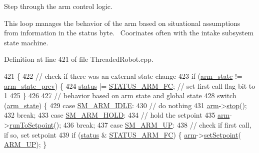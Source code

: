 Step through the arm control logic. 

This loop manages the behavior of the arm based on situational assumptions from information in the status byte.~\newline
 Coorinates often with the intake subsystem state machine. 

Definition at line 421 of file Threaded\+Robot.\+cpp.


\begin{DoxyCode}
421                                       \{
422     \textcolor{comment}{// check if there was an external state change}
423     \textcolor{keywordflow}{if} (\hyperlink{class_threaded_robot_a19026abe96d44213f7e8b3983be2d968}{arm\_state} != \hyperlink{class_threaded_robot_a77a621d5f607ff296ceac51c831a3258}{arm\_state\_prev}) \{
424         \hyperlink{class_threaded_robot_a10f3a9d1b27ca8e7a1ada75323c75879}{status} |= \hyperlink{_threaded_robot_8hpp_af64a9cac77953e37e9facd5f39a41ea6}{STATUS\_ARM\_FC}; \textcolor{comment}{// set first call flag bit to 1}
425     \}
426 
427     \textcolor{comment}{// behavior based on arm state and global state}
428     \textcolor{keywordflow}{switch} (\hyperlink{class_threaded_robot_a19026abe96d44213f7e8b3983be2d968}{arm\_state}) \{
429         \textcolor{keywordflow}{case} \hyperlink{_threaded_robot_8hpp_a96fec3d4c162b9ffe5c1c5847c58f1d9}{SM\_ARM\_IDLE}:
430             \textcolor{comment}{// do nothing}
431             \hyperlink{class_threaded_robot_afc4445eed32ecc9c375e17ccf4f37241}{arm}->\hyperlink{class_arm_a4a2070a27aecb7129cb89f4c9231278a}{stop}();
432             \textcolor{keywordflow}{break};
433         \textcolor{keywordflow}{case} \hyperlink{_threaded_robot_8hpp_a17eb65c231c0816f2929a40e1af28a8a}{SM\_ARM\_HOLD}:
434             \textcolor{comment}{// hold the setpoint}
435             \hyperlink{class_threaded_robot_afc4445eed32ecc9c375e17ccf4f37241}{arm}->\hyperlink{class_arm_a8cd24cca4215a944bd47df13e252e8a0}{runToSetpoint}();
436             \textcolor{keywordflow}{break};
437         \textcolor{keywordflow}{case} \hyperlink{_threaded_robot_8hpp_ab81e7b2b3227c0de1b76dcfdddb78f75}{SM\_ARM\_UP}:
438             \textcolor{comment}{// check if first call, if so, set setpoint}
439             \textcolor{keywordflow}{if} (\hyperlink{class_threaded_robot_a10f3a9d1b27ca8e7a1ada75323c75879}{status} & \hyperlink{_threaded_robot_8hpp_af64a9cac77953e37e9facd5f39a41ea6}{STATUS\_ARM\_FC}) \{ \hyperlink{class_threaded_robot_afc4445eed32ecc9c375e17ccf4f37241}{arm}->\hyperlink{class_arm_a331502c3508a7d8137d9405f050ecbbf}{setSetpoint}(
      \hyperlink{config_8h_a5802759eadaedbee1fad0989f746e940}{ARM\_UP}); \}

\end{DoxyCode}
